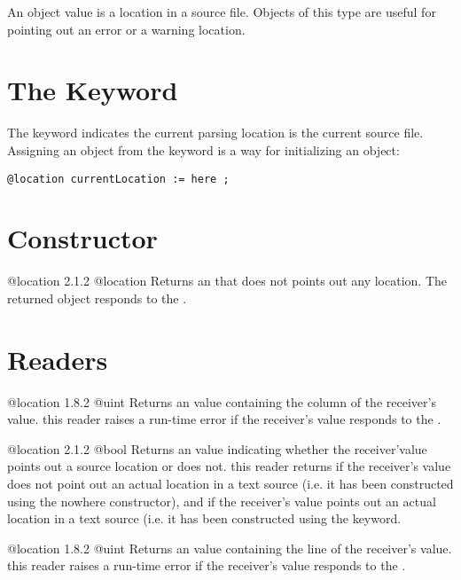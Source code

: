 

An  object value is a location in a source file. Objects of this type are useful for pointing out an error or a warning location.

\section{The  Keyword}

The  keyword indicates the current parsing location is the current source file. Assigning an  object from the  keyword is a way for initializing an  object:\newline

\texttt{@location currentLocation := here ;}

\section{Constructor}

{@location}
{2.1.2}
{@location}
{Returns an  that does not points out any location.}
{The returned object responds  to the .}

\section{Readers}

{@location}
{1.8.2}
{@uint}
{Returns an  value containing the column of the receiver's value.}
{this reader raises a run-time error if the receiver's value responds  to the .}


{@location}
{2.1.2}
{@bool}
{Returns an  value indicating whether the receiver'value points out a source location or does not.}
{this reader returns  if the receiver's value does not point out an actual location in a text source (i.e. it has been constructed using the nowhere constructor), and  if the receiver's value points out an actual location in a text source (i.e. it has been constructed using the  keyword.}


{@location}
{1.8.2}
{@uint}
{Returns an  value containing the line of the receiver's value.}
{this reader raises a run-time error if the receiver's value responds  to the .}


